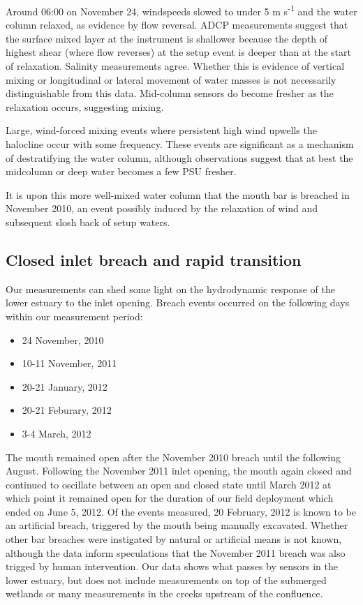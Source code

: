 Around 06:00 on November 24, windspeeds slowed to under 5 m s\textsuperscript{-1} and the water column relaxed, as evidence by flow reversal. ADCP measurements suggest that the surface mixed layer at the instrument is shallower because the depth of highest shear (where flow reverses) at the setup event is deeper than at the start of relaxation. Salinity measurements agree. Whether this is evidence of vertical mixing or longitudinal or lateral movement of water masses is not necessarily distinguishable from this data. Mid-column sensors do become fresher as the relaxation occurs, suggesting mixing. 

Large, wind-forced mixing events where persistent high wind upwells the halocline occur with some frequency. These events are significant as a mechanism of destratifying the water column, although observations suggest that at best the midcolumn or deep water becomes a few PSU fresher. 

It is upon this more well-mixed water column that the mouth bar is breached in November 2010, an event possibly induced by the relaxation of wind and subsequent slosh back of setup waters. 

\subsection{Closed inlet breach and rapid transition} \label{breach_dynamics}
Our measurements can shed some light on the hydrodynamic response of the lower estuary to the inlet opening. Breach events occurred on the following days within our measurement period:
\begin{itemize}
	\item 24 November, 2010
	\item 10-11 November, 2011
	\item 20-21 January, 2012
	\item 20-21 Feburary, 2012
	\item 3-4 March, 2012
\end{itemize}
The mouth remained open after the November 2010 breach until the following August. Following the November 2011 inlet opening, the mouth again closed and continued to oscillate between an open and closed state until March 2012 at which point it remained open for the duration of our field deployment which ended on June 5, 2012. Of the events measured, 20 February, 2012 is known to be an artificial breach, triggered by the mouth being manually excavated. Whether other bar breaches were instigated by natural or artificial means is not known, although the data inform speculations that the November 2011 breach was also trigged by human intervention. Our data shows what passes by sensors in the lower estuary, but does not include measurements on top of the submerged wetlands or many measurements in the creeks upstream of the confluence.


